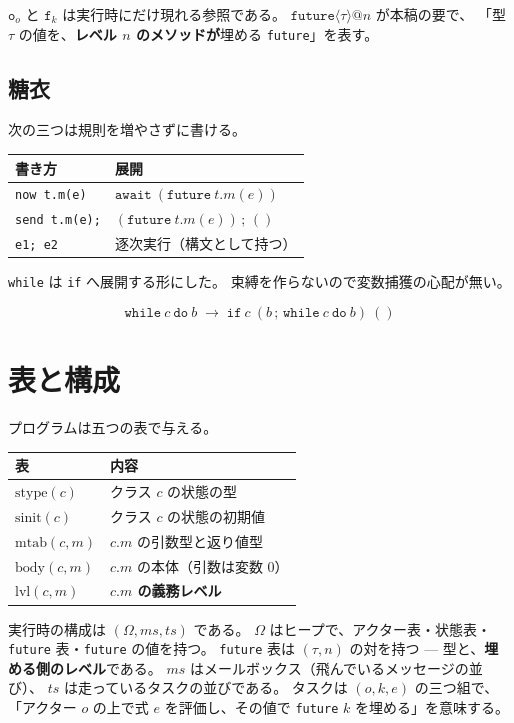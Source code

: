 \documentclass[11pt,a4paper]{ltjsarticle}
\makeatletter
\theoremstyle{definition}
\theoremstyle{remark}
\newcommand{\Om}{\Omega}
\newcommand{\mtab}{\mathrm{mtab}}
\newcommand{\stype}{\mathrm{stype}}
\newcommand{\tfutl}[2]{\ensuremath{\mathtt{future}\langle #1 \rangle @ #2}}
\newcommand{\lvl}{\mathrm{lvl}}
\makeatother
\begin{document}
$\mathtt{o}_o$ と $\mathtt{f}_k$ は実行時にだけ現れる参照である。
$\tfutl{\tau}{n}$ が本稿の要で、
「型 $\tau$ の値を、\textbf{レベル $n$ のメソッドが}埋める \texttt{future}」を表す。

\subsection{糖衣}

次の三つは規則を増やさずに書ける。

\begin{center}
\begin{tabular}{@{}ll@{}}
\toprule
書き方 & 展開 \\
\midrule
\texttt{now t.m(e)} & $\mathtt{await}\ (\mathtt{future}\ t.m(e))$ \\
\texttt{send t.m(e);} & $(\mathtt{future}\ t.m(e))\, ;\, ()$ \\
\texttt{e1; e2} & 逐次実行（構文として持つ） \\
\bottomrule
\end{tabular}
\end{center}

\texttt{while} は \texttt{if} へ展開する形にした。
束縛を作らないので変数捕獲の心配が無い。

\[
\mathtt{while}\ c\ \mathtt{do}\ b
\;\longrightarrow\;
\mathtt{if}\ c\ (b\, ;\, \mathtt{while}\ c\ \mathtt{do}\ b)\ ()
\]

\section{表と構成}

プログラムは五つの表で与える。

\begin{center}
\small
\begin{tabular}{@{}ll@{}}
\toprule
表 & 内容 \\
\midrule
$\stype(c)$ & クラス $c$ の状態の型 \\
$\mathrm{sinit}(c)$ & クラス $c$ の状態の初期値 \\
$\mtab(c,m)$ & $c.m$ の引数型と返り値型 \\
$\mathrm{body}(c,m)$ & $c.m$ の本体（引数は変数 $0$） \\
$\lvl(c,m)$ & \textbf{$c.m$ の義務レベル} \\
\bottomrule
\end{tabular}
\end{center}

実行時の構成は $(\Om, \mathit{ms}, \mathit{ts})$ である。
$\Om$ はヒープで、アクター表・状態表・\texttt{future} 表・\texttt{future} の値を持つ。
\texttt{future} 表は $(\tau, n)$ の対を持つ --- 型と、\textbf{埋める側のレベル}である。
$\mathit{ms}$ はメールボックス（飛んでいるメッセージの並び）、
$\mathit{ts}$ は走っているタスクの並びである。
タスクは $(o, k, e)$ の三つ組で、
「アクター $o$ の上で式 $e$ を評価し、その値で \texttt{future} $k$ を埋める」を意味する。
\end{document}
